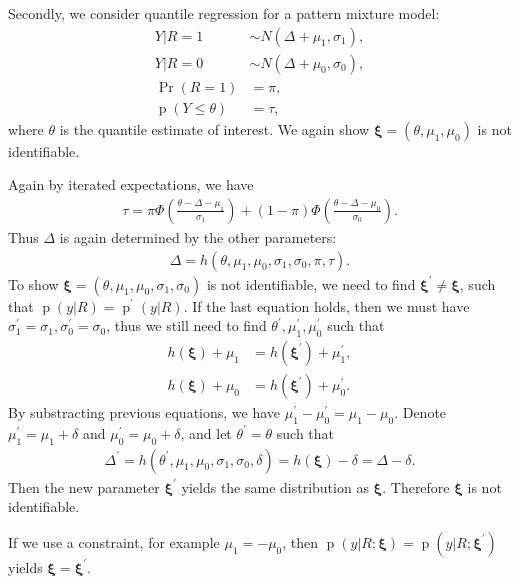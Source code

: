 \documentclass[12pt]{article}
\DeclareMathOperator{\pr}{p}
\DeclareMathOperator{\prob}{Pr}
\begin{document}
Secondly, we consider quantile regression for a pattern mixture model:
\begin{align*}
  Y | R = 1 & \sim N(\Delta + \mu_1, \sigma_1),\\
  Y | R = 0 & \sim N(\Delta + \mu_0, \sigma_0),\\
  \prob (R = 1) & = \pi,\\
  \pr (Y \leq \theta ) & = \tau,
\end{align*}
where $\theta$ is the quantile estimate of interest. We again show
$\bm \xi = (\theta, \mu_1, \mu_0) $ is not identifiable.

Again by iterated expectations, we have
\begin{align*}
  \tau = \pi \Phi \left( \frac{\theta - \Delta - \mu_1}{\sigma_1}
  \right) + (1 - \pi) \Phi \left( \frac{\theta - \Delta -
      \mu_0}{\sigma_0} \right).
\end{align*}
Thus $\Delta$ is again determined by the other parameters:
\begin{align*}
  \Delta = h(\theta, \mu_1, \mu_0, \sigma_1, \sigma_0, \pi, \tau).
\end{align*}
To show $\bm \xi = (\theta, \mu_1, \mu_0, \sigma_1, \sigma_0)$ is not
identifiable, we need to find $\bm \xi^{'} \neq \bm \xi$, such that
$\pr(y|R) = \pr^{'}(y|R)$. If the last equation holds, then we must
have $\sigma_1^{'} = \sigma_1, \sigma_0^{'} = \sigma_0$, thus we still
need to find $\theta^{'}, \mu_1^{'}, \mu_0^{'}$ such that
\begin{align*}
  h(\bm \xi) + \mu_1 & = h(\bm \xi^{'}) + \mu_1^{'},\\
  h(\bm \xi) + \mu_0 & = h(\bm \xi^{'}) + \mu_0^{'}.
\end{align*}
By substracting previous equations, we have $\mu_1^{'}- \mu_0^{'} =
\mu_1- \mu_0$. Denote $\mu_1^{'} = \mu_1 + \delta$ and $\mu_0^{'} =
\mu_0 + \delta$, and let $\theta^{'} = \theta$ such that
\begin{align*}
  \Delta^{'} = h(\theta^{'}, \mu_1, \mu_0, \sigma_1, \sigma_0, \delta)
  = h(\bm \xi) - \delta = \Delta - \delta.
\end{align*}
Then the new parameter $\bm \xi^{'}$ yields the same distribution as
$\bm \xi$. Therefore $\bm \xi$ is not identifiable.

If we use a constraint, for example $\mu_1 = -\mu_0$, then
$\pr(y|R;\bm \xi) = \pr(y|R; \bm \xi^{'})$ yields $\bm \xi = \bm
\xi^{'}$.
\end{document}
